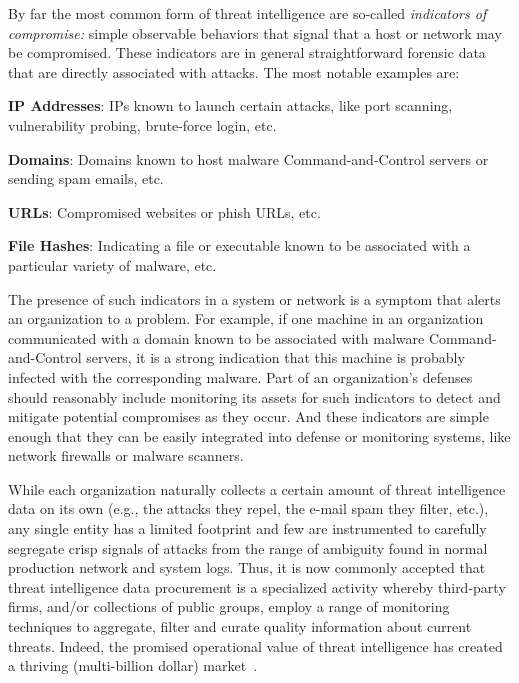 By far the most common form of threat intelligence are so-called 
\emph{indicators of compromise:} simple observable behaviors that 
signal that a host or network may be compromised. These indicators 
are in general straightforward forensic data that are directly 
associated with attacks. The most notable examples are:
\begin{prettylist}
    \item \textbf{IP Addresses}: IPs known to launch certain 
    attacks, like port scanning, vulnerability probing, brute-force login, etc.
    \item \textbf{Domains}: Domains known to host 
    malware Command-and-Control servers or sending spam emails, etc.
    \item \textbf{URLs}: Compromised websites or phish URLs, etc.
    \item \textbf{File Hashes}: Indicating a file or executable 
    known to be associated with a particular variety of malware, etc.
\end{prettylist}

The presence of such indicators in a system or network is a symptom 
that alerts an organization to a problem. For example, if one 
machine in an organization communicated with a domain known to be
associated with malware Command-and-Control servers, it is a strong
indication that this machine is probably infected with the 
corresponding malware. Part of an organization's defenses 
should reasonably include monitoring its assets
for such indicators to detect and mitigate potential compromises as
they occur. And these indicators are simple enough that they can be
easily integrated into defense or monitoring systems, like network
firewalls or malware scanners.

While each organization naturally collects a certain amount of threat
intelligence data on its own (e.g., the attacks they repel, the e-mail
spam they filter, etc.), any single entity has a limited footprint and
few are instrumented to carefully segregate crisp signals of attacks
from the range of ambiguity found in normal production network and
system logs. Thus, it is now commonly accepted that threat
intelligence data procurement is a specialized activity whereby
third-party firms, and/or collections of public groups, employ a range
of monitoring techniques to aggregate, filter and curate quality
information about current threats.  Indeed, the promised operational
value of threat intelligence has created a thriving (multi-billion
dollar) market~\cite{timarket}. 

